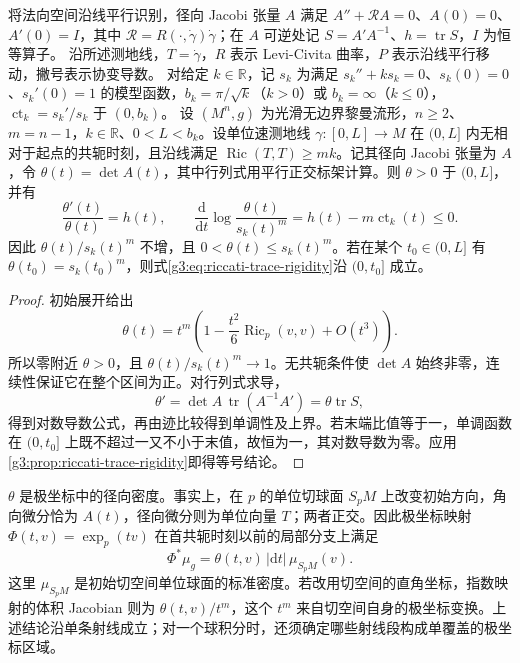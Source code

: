 \begin{proposition}\label{g3:prop:radial-density-comparison}
	将法向空间沿线平行识别，径向 Jacobi 张量 \(A\) 满足 \(A''+\mathcal RA=0\)、\(A(0)=0\)、\(A'(0)=I\)，其中 \(\mathcal R=R(\cdot,\dot\gamma)\dot\gamma\)；在 \(A\) 可逆处记 \(S=A'A^{-1}\)、\(h=\operatorname{tr}S\)，\(I\) 为恒等算子。
	沿所述测地线，\(T=\dot\gamma\)，\(R\) 表示 Levi-Civita 曲率，\(P\) 表示沿线平行移动，撇号表示协变导数。
	对给定 \(k\in\mathbb R\)，记 \(s_k\) 为满足 \(s_k''+ks_k=0\)、\(s_k(0)=0\)、\(s_k'(0)=1\) 的模型函数，\(b_k=\pi/\sqrt k\)（\(k>0\)）或 \(b_k=\infty\)（\(k\le0\)），\(\operatorname{ct}_k=s_k'/s_k\) 于 \((0,b_k)\)。
	设 \((M^n,g)\) 为光滑无边界黎曼流形，\(n\ge2\)、\(m=n-1\)，\(k\in\mathbb R\)、\(0<L<b_k\)。设单位速测地线 \(\gamma:[0,L]\to M\) 在 \((0,L]\) 内无相对于起点的共轭时刻，且沿线满足 \(\operatorname{Ric}(T,T)\ge mk\)。记其径向 Jacobi 张量为 \(A\)，令
	\(\theta(t)=\det A(t)\)，其中行列式用平行正交标架计算。则 \(\theta>0\) 于 \((0,L]\)，并有
	\begin{equation}\label{g3:eq:radial-density-logarithm}
		\frac{\theta'(t)}{\theta(t)}=h(t),\qquad
		\frac{\mathrm d}{\mathrm dt}\log\frac{\theta(t)}{s_k(t)^m}
		=h(t)-m\operatorname{ct}_k(t)\le0.
	\end{equation}
	因此 \(\theta(t)/s_k(t)^m\) 不增，且 \(0<\theta(t)\le s_k(t)^m\)。若在某个 \(t_0\in(0,L]\) 有 \(\theta(t_0)=s_k(t_0)^m\)，则式\eqref{g3:eq:riccati-trace-rigidity}沿 \((0,t_0]\) 成立。
\end{proposition}
\begin{proof}
	初始展开给出
	\[
		\theta(t)=t^m\left(1-\frac{t^2}{6}\operatorname{Ric}_p(v,v)+O(t^3)\right).
	\]
	所以零附近 \(\theta>0\)，且 \(\theta(t)/s_k(t)^m\to1\)。无共轭条件使 \(\det A\) 始终非零，连续性保证它在整个区间为正。对行列式求导，
	\[
		\theta'=\det A\,\operatorname{tr}(A^{-1}A')=\theta\operatorname{tr}S,
	\]
	得到对数导数公式，再由迹比较得到单调性及上界。若末端比值等于一，单调函数在 \((0,t_0]\) 上既不超过一又不小于末值，故恒为一，其对数导数为零。应用\cref{g3:prop:riccati-trace-rigidity}即得等号结论。
\end{proof}

\(\theta\) 是极坐标中的径向密度。事实上，在 \(p\) 的单位切球面 \(S_pM\) 上改变初始方向，角向微分恰为 \(A(t)\)，径向微分则为单位向量 \(T\)；两者正交。因此极坐标映射 \(\Phi(t,v)=\exp_p(tv)\) 在首共轭时刻以前的局部分支上满足
\[
	\Phi^*\mu_g=\theta(t,v)\,|\mathrm dt|\,\mu_{S_pM}(v).
\]
这里 \(\mu_{S_pM}\) 是初始切空间单位球面的标准密度。若改用切空间的直角坐标，指数映射的体积 Jacobian 则为 \(\theta(t,v)/t^m\)，这个 \(t^m\) 来自切空间自身的极坐标变换。上述结论沿单条射线成立；对一个球积分时，还须确定哪些射线段构成单覆盖的极坐标区域。

